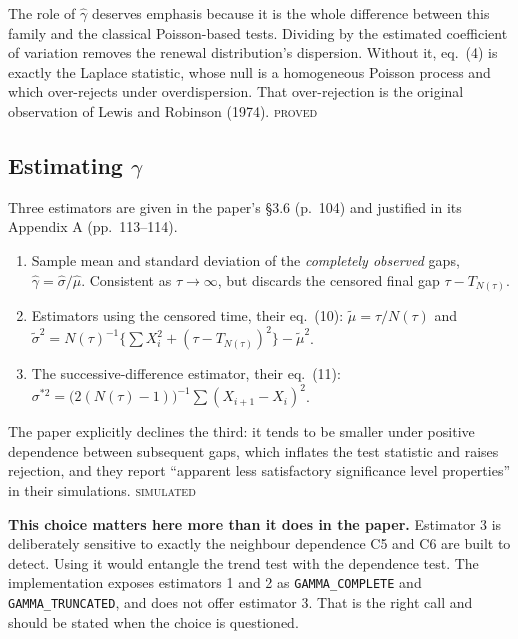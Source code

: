 \documentclass[11pt,a4paper]{article}
\newcommand{\gh}{\hat\gamma}
\newcommand{\Ntau}{N(\tau)}
\newcommand{\PROVED}{\textsc{\textcolor{blue!55!black}{proved}}}
\newcommand{\SIMULATED}{\textsc{\textcolor{orange!70!black}{simulated}}}
\begin{document}
\medskip
\noindent
The role of $\gh$ deserves emphasis because it is the whole difference between this
family and the classical Poisson-based tests. Dividing by the estimated coefficient of
variation removes the renewal distribution's dispersion. Without it, eq.~(4) is exactly
the Laplace statistic, whose null is a homogeneous Poisson process and which
over-rejects under overdispersion. That over-rejection is the original observation of
Lewis and Robinson (1974). \PROVED

\subsection{Estimating \texorpdfstring{$\gamma$}{gamma}}

Three estimators are given in the paper's \S 3.6 (p.~104) and justified in its Appendix A
(pp.~113--114).

\begin{enumerate}[leftmargin=1.6em,itemsep=2pt]
\item Sample mean and standard deviation of the \emph{completely observed} gaps,
$\gh = \hat\sigma / \hat\mu$. Consistent as $\tau\to\infty$, but discards the censored
final gap $\tau - T_{\Ntau}$.
\item Estimators using the censored time, their eq.~(10):
$\tilde\mu = \tau/\Ntau$ and
$\tilde\sigma^2 = \Ntau^{-1}\bigl\{\sum X_i^2 + (\tau - T_{\Ntau})^2\bigr\} - \tilde\mu^2$.
\item The successive-difference estimator, their eq.~(11):
$\sigma^{*2} = \bigl(2(\Ntau-1)\bigr)^{-1}\sum (X_{i+1}-X_i)^2$.
\end{enumerate}

The paper explicitly declines the third: it tends to be smaller under positive
dependence between subsequent gaps, which inflates the test statistic and raises
rejection, and they report \enquote{apparent less satisfactory significance level
properties} in their simulations. \SIMULATED

\medskip
\noindent\textbf{This choice matters here more than it does in the paper.} Estimator 3
is deliberately sensitive to exactly the neighbour dependence C5 and C6 are built to
detect. Using it would entangle the trend test with the dependence test. The
implementation exposes estimators 1 and 2 as \texttt{GAMMA\_COMPLETE} and
\texttt{GAMMA\_TRUNCATED}, and does not offer estimator 3. That is the right call and
should be stated when the choice is questioned.

\end{document}
